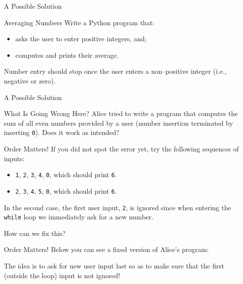 \documentclass[aspectratio=169, 12pt, xcolor=table]{beamer}
\begin{document}
	\begin{frame}{A Possible Solution}
		
	\end{frame}

	\begin{frame}{Averaging Numbers}
		Write a Python program that:
		\begin{itemize}
			\item asks the user to enter positive integers, and;
			\item computes and prints their average.
		\end{itemize}
		Number entry should stop once the user enters a non--positive integer (i.e., negative or zero).
	\end{frame}

	\begin{frame}{A Possible Solution}
		
	\end{frame}
	
	\begin{frame}{What Is Going Wrong Here?}
		Alice tried to write a program that computes the sum of all even numbers provided by a user (number insertion terminated by inserting \texttt{0}). Does it work as intended?
		
	\end{frame}

	\begin{frame}{Order Matters!}
		If you did not spot the error yet, try the following sequences of inputs:
		\begin{itemize}
			\item \texttt{1}, \texttt{2}, \texttt{3}, \texttt{4}, \texttt{0}, which should print \texttt{6}.
			\item \texttt{2}, \texttt{3}, \texttt{4}, \texttt{5}, \texttt{0}, which should print \texttt{6}.
		\end{itemize}
		In the second case, the first user input, \texttt{2}, is ignored since when entering the \texttt{while} loop we immediately ask for a new number.
		
		How can we fix this?
	\end{frame}

	\begin{frame}{Order Matters!}
		Below you can see a fixed version of Alice's program:
		
		The idea is to ask for new user input last so as to make sure that the first (outside the loop) input is not ignored!
	\end{frame}
	
\end{document}
